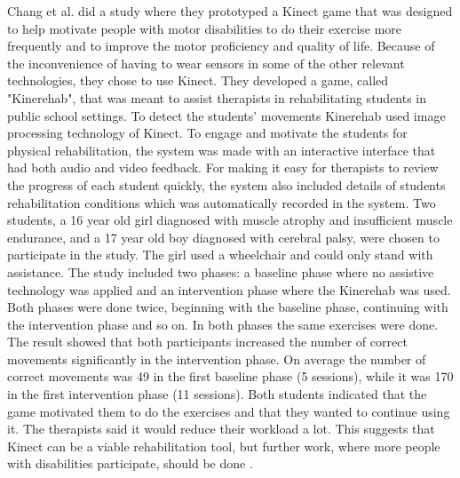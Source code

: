 Chang et al. \cite{kinect} did a study where they prototyped a Kinect game that was designed to help motivate people with motor disabilities to do their exercise more frequently and to improve the motor proficiency and quality of life. Because of the inconvenience of having to wear sensors in some of the other relevant technologies, they chose to use Kinect. They developed a game, called "Kinerehab", that was meant to assist therapists in rehabilitating students in public school settings. To detect the students’ movements Kinerehab used image processing technology of Kinect. To engage and motivate the students for physical rehabilitation, the system was made with an interactive interface that had both audio and video feedback. For making it easy for therapists to review the progress of each student quickly, the system also included details of students rehabilitation conditions which was automatically recorded in the system. Two students, a 16 year old girl diagnosed with  muscle atrophy and insufficient muscle endurance, and a 17 year old boy diagnosed with cerebral palsy, were chosen to participate in the study. The girl used a wheelchair and could only stand with assistance. The study included two phases: a baseline phase  where no assistive technology was applied and an intervention phase where the Kinerehab was used. Both phases were done twice, beginning with the baseline phase, continuing with the intervention phase and so on. In both phases the same exercises were done. The result showed that both participants increased the number of correct movements significantly in the intervention phase. On average the number of correct movements was 49 in the first baseline phase (5 sessions), while it was 170 in the first intervention phase (11 sessions). Both students indicated that the game motivated them to do the exercises and that they wanted to continue using it. The therapists said it would reduce their workload a lot. This suggests that Kinect can be a viable rehabilitation tool, but further work, where more people with disabilities participate, should be done \cite{kinect}. \\ \\ 
